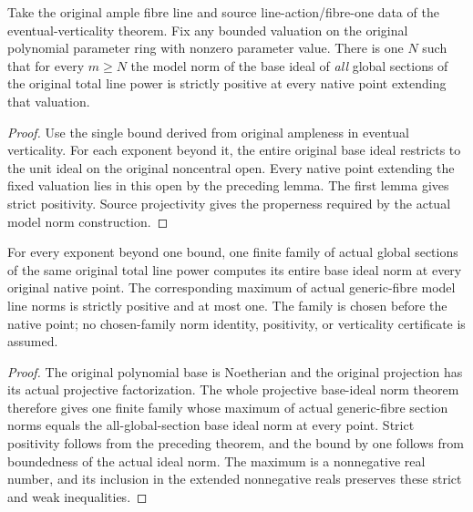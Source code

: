 \begin{theorem}\label{thm:native-test-configuration-eventual-positive-base-ideal-norm}
\leanok
{}
Take the original ample fibre line and source line-action/fibre-one data
of the eventual-verticality theorem. Fix any bounded valuation on the
original polynomial parameter ring with nonzero parameter value. There
is one $N$ such that for every $m\ge N$ the model norm of the base ideal
of \emph{all} global sections of the original total line power is
strictly positive at every native point extending that valuation.
\end{theorem}
\begin{proof}
Use the single bound derived from original ampleness in eventual
verticality. For each exponent beyond it, the entire original base ideal
restricts to the unit ideal on the original noncentral open. Every native
point extending the fixed valuation lies in this open by the preceding
lemma. The first lemma gives strict positivity. Source projectivity gives
the properness required by the actual model norm construction.
\end{proof}

\begin{theorem}\label{thm:native-test-configuration-eventual-finite-positive-norm-family}
\leanok
{}
For every exponent beyond one bound, one finite family of actual global
sections of the same original total line power computes its entire base
ideal norm at every original native point. The corresponding maximum of
actual generic-fibre model line norms is strictly positive and at most one.
The family is chosen before the native point; no chosen-family norm
identity, positivity, or verticality certificate is assumed.
\end{theorem}
\begin{proof}
The original polynomial base is Noetherian and the original projection
has its actual projective factorization. The whole projective base-ideal
norm theorem therefore gives one finite family whose maximum of actual
generic-fibre section norms equals the all-global-section base ideal norm
at every point. Strict positivity follows from the preceding theorem,
and the bound by one follows from boundedness of the actual ideal norm.
The maximum is a nonnegative real number, and its inclusion in the
extended nonnegative reals preserves these strict and weak inequalities.
\end{proof}
